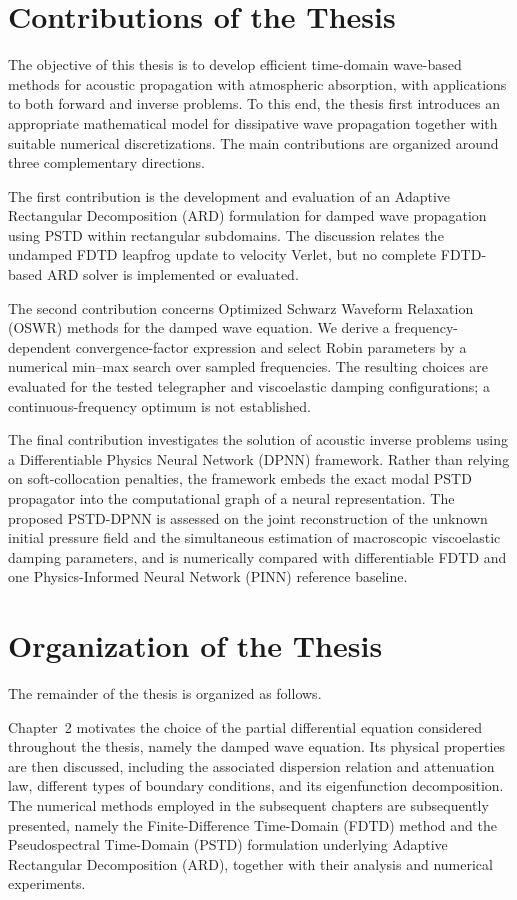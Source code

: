 \documentclass{Configuration_Files/PoliMi3i_thesis}
\newif\ifshowthesischanges
\DeclareRobustCommand{\thesischange}[2]{%
    \ifshowthesischanges
        \textcolor{#1}{#2}%
    \else
        #2%
    \fi
}
\def\thesischange#1#2{#2}%
\begin{document}
\section{Contributions of the Thesis}
The objective of this thesis is to develop efficient time-domain wave-based methods for acoustic propagation with atmospheric absorption, with applications to both forward and inverse problems. To this end, the thesis first introduces an appropriate mathematical model for dissipative wave propagation together with suitable numerical discretizations. The main contributions are organized around three complementary directions.

The first contribution is the development and evaluation of an Adaptive Rectangular Decomposition (ARD) formulation for damped wave propagation using PSTD within rectangular subdomains. The discussion relates the undamped FDTD leapfrog update to velocity Verlet, but no complete FDTD-based ARD solver is implemented or evaluated.

The second contribution concerns Optimized Schwarz Waveform Relaxation (OSWR) methods for the damped wave equation. We derive a frequency-dependent convergence-factor expression and select Robin parameters by a numerical min--max search over sampled frequencies. The resulting choices are evaluated for the tested telegrapher and viscoelastic damping configurations; a continuous-frequency optimum is not established.

\thesischange{red}{The final contribution investigates the solution of acoustic inverse problems using a Differentiable Physics Neural Network (DPNN) framework. Rather than relying on soft-collocation penalties, the framework embeds the exact modal PSTD propagator into the computational graph of a neural representation. The proposed PSTD-DPNN is assessed on the joint reconstruction of the unknown initial pressure field and the simultaneous estimation of macroscopic viscoelastic damping parameters, and is numerically compared with differentiable FDTD and one Physics-Informed Neural Network (PINN) reference baseline.}
%
\section{Organization of the Thesis}
The remainder of the thesis is organized as follows.

Chapter~2 motivates the choice of the partial differential equation considered throughout the thesis, namely the damped wave equation. Its physical properties are then discussed, including the associated dispersion relation and attenuation law, different types of boundary conditions, and its eigenfunction decomposition. The numerical methods employed in the subsequent chapters are subsequently presented, namely the Finite-Difference Time-Domain (FDTD) method and the Pseudospectral Time-Domain (PSTD) formulation underlying Adaptive Rectangular Decomposition (ARD), together with their analysis and numerical experiments.
\end{document}
